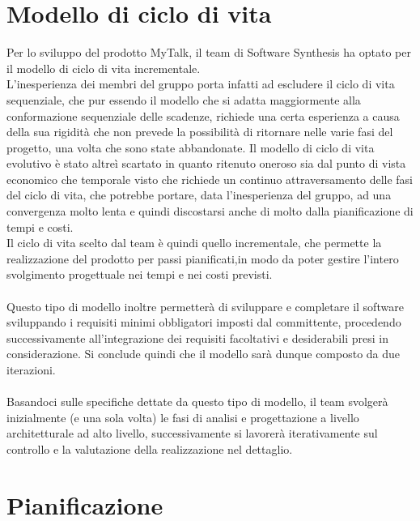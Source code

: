 \section{Modello di ciclo di vita}
Per lo sviluppo del prodotto MyTalk, il team di Software Synthesis ha optato per il modello di ciclo di vita incrementale.\\
L'inesperienza dei membri del gruppo porta infatti ad escludere il ciclo di vita sequenziale, che pur essendo il modello che si adatta maggiormente alla conformazione sequenziale delle scadenze, richiede una certa esperienza a causa della sua rigidità che non prevede la possibilità di ritornare nelle varie fasi del progetto, una volta che sono state abbandonate.
Il modello di ciclo di vita evolutivo è stato altreì scartato in quanto ritenuto oneroso sia dal punto di vista economico che temporale visto che richiede un continuo attraversamento delle fasi del ciclo di vita, che potrebbe portare, data l'inesperienza del gruppo, ad una convergenza molto lenta e quindi discostarsi anche di molto dalla pianificazione di tempi e costi.\\
Il ciclo di vita scelto dal team è quindi quello incrementale, che permette la realizzazione del prodotto per passi pianificati,in modo da poter gestire l'intero svolgimento progettuale nei tempi e nei costi previsti.\\\\
Questo tipo di modello inoltre permetterà di sviluppare e completare il software sviluppando i requisiti minimi obbligatori imposti dal committente, procedendo successivamente all'integrazione dei requisiti facoltativi e desiderabili presi in considerazione. Si conclude quindi che il modello sarà dunque composto da due iterazioni.\\\\
Basandoci sulle specifiche dettate da questo tipo di modello, il team svolgerà inizialmente (e una sola volta) le fasi di analisi e progettazione a livello architetturale ad alto livello, successivamente si lavorerà iterativamente sul controllo e la valutazione della realizzazione nel dettaglio.
\clearpage
\section{Pianificazione}
